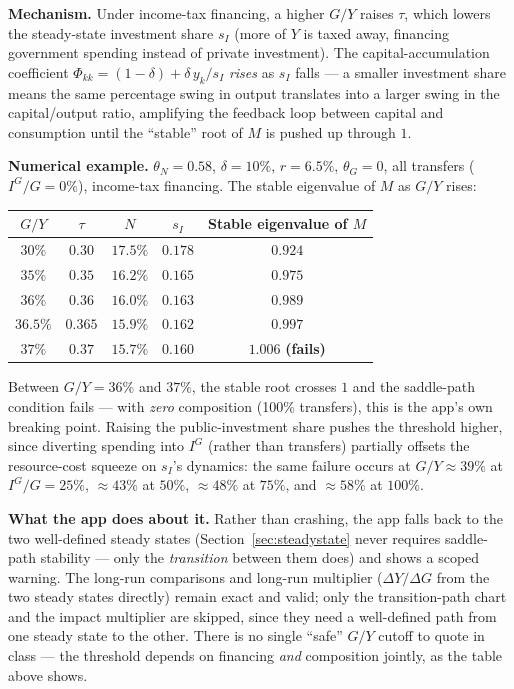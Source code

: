 \documentclass[11pt]{article}
\begin{document}
\textbf{Mechanism.} Under income-tax financing, a higher $G/Y$ raises
$\tau$, which lowers the steady-state investment share $s_I$ (more of $Y$
is taxed away, financing government spending instead of private
investment). The capital-accumulation coefficient
$\Phi_{kk}=(1-\delta)+\delta\,y_k/s_I$ \emph{rises} as $s_I$ falls --- a
smaller investment share means the same percentage swing in output
translates into a larger swing in the capital/output ratio, amplifying
the feedback loop between capital and consumption until the ``stable''
root of $M$ is pushed up through $1$.

\begin{casebox}
\textbf{Numerical example.} $\theta_N=0.58$, $\delta=10\%$, $r=6.5\%$,
$\theta_G=0$, all transfers ($I^G/G=0\%$), income-tax financing. The
stable eigenvalue of $M$ as $G/Y$ rises:
\begin{center}
\begin{tabular}{ccccc}
\toprule
$G/Y$ & $\tau$ & $N$ & $s_I$ & Stable eigenvalue of $M$ \\
\midrule
$30\%$ & $0.30$ & $17.5\%$ & $0.178$ & $0.924$ \\
$35\%$ & $0.35$ & $16.2\%$ & $0.165$ & $0.975$ \\
$36\%$ & $0.36$ & $16.0\%$ & $0.163$ & $0.989$ \\
$36.5\%$ & $0.365$ & $15.9\%$ & $0.162$ & $0.997$ \\
$37\%$ & $0.37$ & $15.7\%$ & $0.160$ & $1.006$ \textbf{(fails)} \\
\bottomrule
\end{tabular}
\end{center}
Between $G/Y=36\%$ and $37\%$, the stable root crosses $1$ and the
saddle-path condition fails --- with \emph{zero} composition (100\%
transfers), this is the app's own breaking point. Raising the
public-investment share pushes the threshold higher, since diverting
spending into $I^G$ (rather than transfers) partially offsets the
resource-cost squeeze on $s_I$'s dynamics: the same failure occurs at
$G/Y\approx 39\%$ at $I^G/G=25\%$, $\approx 43\%$ at $50\%$,
$\approx 48\%$ at $75\%$, and $\approx 58\%$ at $100\%$.
\end{casebox}

\begin{notebox}
\textbf{What the app does about it.} Rather than crashing, the app falls
back to the two well-defined steady states (Section~\ref{sec:steadystate}
never requires saddle-path stability --- only the \emph{transition}
between them does) and shows a scoped warning. The long-run comparisons
and long-run multiplier ($\Delta Y/\Delta G$ from the two steady states
directly) remain exact and valid; only the transition-path chart and the
impact multiplier are skipped,
since they need a well-defined path from one steady state to the other.
There is no single ``safe'' $G/Y$ cutoff to quote in class --- the
threshold depends on financing \emph{and} composition jointly, as the
table above shows.
\end{notebox}
\end{document}
